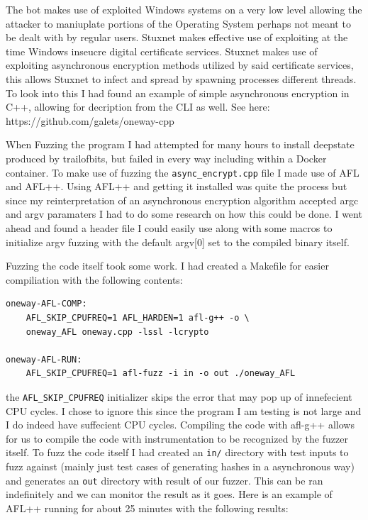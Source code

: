 \documentclass[12pt, letterpaper]{article}
\begin{document}
\begin{sloppypar}
\begin{flushleft}
The bot makes use of exploited Windows systems on a very low level allowing the attacker
to maniuplate portions of the Operating System perhaps not meant to be dealt with by 
regular users. Stuxnet makes effective use of exploiting at the time Windows inseucre 
digital certificate services. Stuxnet makes use of exploiting asynchronous encryption
methods utilized by said certificate services, this allows Stuxnet to infect and spread by
spawning processes different threads. To look into this I had found an example of simple
asynchronous encryption in C++, allowing for decription from the CLI as well. See here:
https://github.com/galets/oneway-cpp

When Fuzzing the program I had attempted for many hours to install deepstate produced
by trailofbits, but failed in every way including within a Docker container. To make use
of fuzzing the \verb|async_encrypt.cpp| file I made use of AFL and AFL++. Using AFL++ and getting 
it installed was quite the process but since my reinterpretation of an asynchronous 
encryption algorithm accepted argc and argv paramaters I had to do some research on how
this could be done. I went ahead and found a header file I could easily use along with
some macros to initialize argv fuzzing with the default argv[0] set to the compiled binary
itself. 
 
Fuzzing the code itself took some work. I had created a Makefile for easier compiliation
with the following contents:
\begin{verbatim}
oneway-AFL-COMP: 
	AFL_SKIP_CPUFREQ=1 AFL_HARDEN=1 afl-g++ -o \
	oneway_AFL oneway.cpp -lssl -lcrypto

oneway-AFL-RUN:
	AFL_SKIP_CPUFREQ=1 afl-fuzz -i in -o out ./oneway_AFL
\end{verbatim}
the \verb|AFL_SKIP_CPUFREQ| initializer skips the error that may pop up of innefecient 
CPU cycles. I chose to ignore this since the program I am testing is not large and I do
indeed have suffecient CPU cycles. Compiling the code with afl-g++ allows for us to 
compile the code with instrumentation to be recognized by the fuzzer itself. To fuzz the
code itself I had created an \verb|in/| directory with test inputs to fuzz against (mainly
just test cases of generating hashes in a asynchronous way) and generates an \verb|out|
directory with result of our fuzzer. This can be ran indefinitely and we can monitor the 
result as it goes. Here is an example of AFL++ running for about 25 minutes with the 
following results:


\end{flushleft}
\end{sloppypar}
\end{document}
